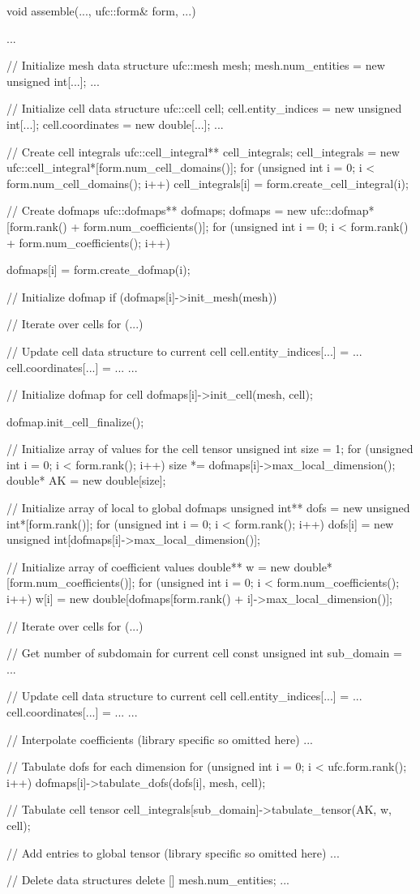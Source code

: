 \scriptsize
\begin{code}
void assemble(..., ufc::form& form, ...)
{
  ...

  // Initialize mesh data structure
  ufc::mesh mesh;
  mesh.num_entities = new unsigned int[...];
  ...

  // Initialize cell data structure
  ufc::cell cell;
  cell.entity_indices = new unsigned int[...];
  cell.coordinates = new double[...];
  ...

  // Create cell integrals
  ufc::cell_integral** cell_integrals;
  cell_integrals = new ufc::cell_integral*[form.num_cell_domains()];
  for (unsigned int i = 0; i < form.num_cell_domains(); i++)
    cell_integrals[i] = form.create_cell_integral(i);

  // Create dofmaps
  ufc::dofmaps** dofmaps;
  dofmaps = new ufc::dofmap*[form.rank() + form.num_coefficients()];
  for (unsigned int i = 0; i < form.rank() + form.num_coefficients(); i++)
  {
    dofmaps[i] = form.create_dofmap(i);

    // Initialize dofmap
    if (dofmaps[i]->init_mesh(mesh))
    {
      // Iterate over cells
      for (...)
      {
        // Update cell data structure to current cell
        cell.entity_indices[...] = ...
        cell.coordinates[...] = ...
        ...

        // Initialize dofmap for cell
        dofmaps[i]->init_cell(mesh, cell);
      }

      dofmap.init_cell_finalize();
    }
  }

  // Initialize array of values for the cell tensor
  unsigned int size = 1;
  for (unsigned int i = 0; i < form.rank(); i++)
    size *= dofmaps[i]->max_local_dimension();
  double* AK = new double[size];

  // Initialize array of local to global dofmaps
  unsigned int** dofs = new unsigned int*[form.rank()];
  for (unsigned int i = 0; i < form.rank(); i++)
    dofs[i] = new unsigned int[dofmaps[i]->max_local_dimension()];

  // Initialize array of coefficient values
  double** w = new double*[form.num_coefficients()];
  for (unsigned int i = 0; i < form.num_coefficients(); i++)
    w[i] = new double[dofmaps[form.rank() + i]->max_local_dimension()];

  // Iterate over cells
  for (...)
  {
    // Get number of subdomain for current cell
    const unsigned int sub_domain = ...

    // Update cell data structure to current cell
    cell.entity_indices[...] = ...
    cell.coordinates[...] = ...
    ...

    // Interpolate coefficients (library specific so omitted here)
    ...

    // Tabulate dofs for each dimension
    for (unsigned int i = 0; i < ufc.form.rank(); i++)
      dofmaps[i]->tabulate_dofs(dofs[i], mesh, cell);

    // Tabulate cell tensor
    cell_integrals[sub_domain]->tabulate_tensor(AK, w, cell);

    // Add entries to global tensor (library specific so omitted here)
    ...
  }

  // Delete data structures
  delete [] mesh.num_entities;
  ...
}
\end{code}
\normalsize
